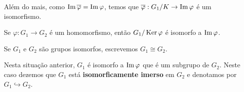 \begin{note}
  Além do mais, como  $\operatorname{Im}\overline{\varphi}=\operatorname{Im}\varphi$, temos que $\overline{\varphi}:G_1/K\to  \operatorname{Im}\varphi$ é um isomorfismo. 
\end{note}
\begin{theorem}
  Se $\varphi:G_1\to G_2$ é um homomorfismo, então $G_1/\operatorname{Ker}\varphi$ é isomorfo a $\operatorname{Im} \varphi$. 
\end{theorem}
\begin{notation}[Isomorfo]
  Se $G_1$ e $G_2$ são grupos isomorfos, escrevemos $G_1 \cong G_2$.
\end{notation}
\begin{note}
  Nesta situação anterior, $G_1$ é isomorfo a $\operatorname{Im}\varphi$ que é um subgrupo de $G_2$. Neste caso dezemos que $G_1$ está \textbf{isomorficamente imerso} em $G_2$ e denotamos por $G_1 \hookrightarrow G_2$. 
\end{note}
